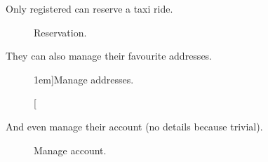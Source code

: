 \newpage %


Only registered can reserve a taxi ride.

\begin{figure}
	\centering
	\caption{Reservation.}
	\label{fig:reservation}
\end{figure}

\newpage %


They can also manage their favourite addresses.

\begin{figure}
	\hfill
	\caption[][1em]{Manage addresses.}
	\label{fig:manageAddresses}
\end{figure}

\newpage %



And even manage their account (no details because trivial).

\begin{figure}
	\centering
	\caption{Manage account.}
	\label{fig:manageAccount}
\end{figure}

